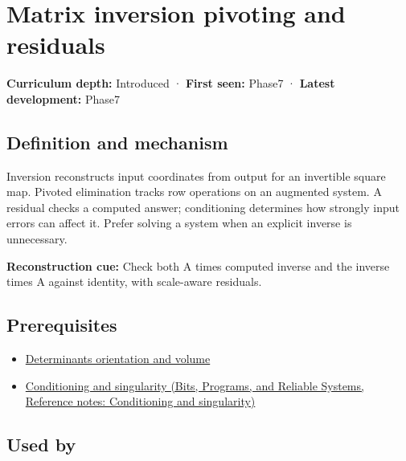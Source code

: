 \hypertarget{appendix-48d2e66378ab}{}\label{referencestart:appendix-48d2e66378ab}
\section{Matrix inversion pivoting and residuals}\label{appendix-48d2e66378ab-matrix-inversion-pivoting-and-residuals}

\textbf{Curriculum depth:} Introduced · \textbf{First seen:} Phase7 · \textbf{Latest development:} Phase7

\begin{allmightroledefinition}

\subsection{Definition and mechanism}\label{appendix-48d2e66378ab-definition-and-mechanism}

Inversion reconstructs input coordinates from output for an invertible square map. Pivoted elimination tracks row operations on an augmented system. A residual checks a computed answer; conditioning determines how strongly input errors can affect it. Prefer solving a system when an explicit inverse is unnecessary.

\end{allmightroledefinition}

\textbf{Reconstruction cue:} Check both A times computed inverse and the inverse times A against identity, with scale-aware residuals.

\subsection{Prerequisites}\label{appendix-48d2e66378ab-prerequisites}

\begin{itemize}
\tightlist
\item
  \hyperref[appendix-da478be01d02]{Determinants orientation and volume}
\item
  \href{../01-Bits-Programs-and-Reliable-Systems/main.pdf\#nameddest=appendix-8f6a01f284a7}{Conditioning and singularity (Bits, Programs, and Reliable Systems, Reference notes: Conditioning and singularity)}
\end{itemize}

\subsection{Used by}\label{appendix-48d2e66378ab-used-by}

